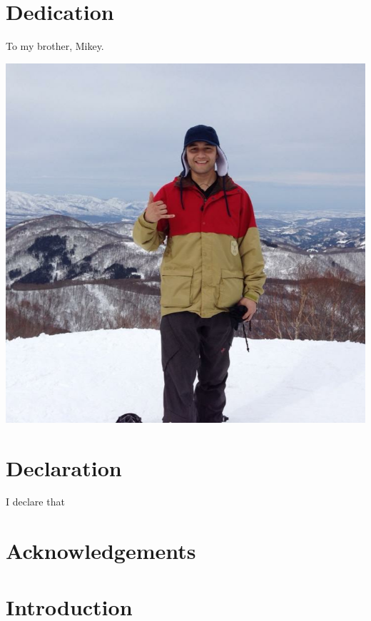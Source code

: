\documentclass[12pt]{report}
\begin{document}
\chapter*{Dedication}
To my brother, Mikey.
\begin{center}
\includegraphics[width=.75\textwidth]{mikey.jpeg}
\end{center}

\chapter*{Declaration}
I declare that

\chapter*{Acknowledgements}

\chapter*{}


\tableofcontents

\newpage


\chapter{Introduction}

\newpage
\end{document}
